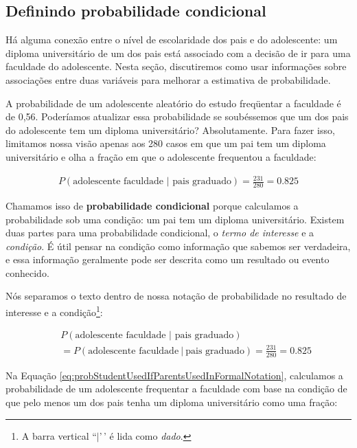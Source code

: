 \documentclass[
]{book}
\theoremstyle{definition}
\theoremstyle{definition}
\theoremstyle{definition}
\theoremstyle{definition}
\theoremstyle{remark}
\begin{document}
\hypertarget{definingConditionalProbability}{%
\subsection{Definindo probabilidade condicional}\label{definingConditionalProbability}}

Há alguma conexão entre o nível de escolaridade dos pais e do adolescente: um diploma universitário de um dos pais está associado com a decisão de ir para uma faculdade do adolescente. Nesta seção, discutiremos como usar informações sobre associações entre duas variáveis para melhorar a estimativa de probabilidade.

A probabilidade de um adolescente aleatório do estudo freqüentar a faculdade é de 0,56. Poderíamos atualizar essa probabilidade se soubéssemos que um dos pais do adolescente tem um diploma universitário? Absolutamente. Para fazer isso, limitamos nossa visão apenas aos 280 casos em que um pai tem um diploma universitário e olha a fração em que o adolescente frequentou a faculdade:

\begin{eqnarray*}
P(\text{adolescente faculdade | pais graduado}) = \frac{231}{280} = 0.825
\end{eqnarray*}

Chamamos isso de \textbf{probabilidade condicional} porque calculamos a probabilidade sob uma condição: um pai tem um diploma universitário. Existem duas partes para uma probabilidade condicional, o \emph{termo de interesse} e a \emph{condição}. É útil pensar na condição como informação que sabemos ser verdadeira, e essa informação geralmente pode ser descrita como um resultado ou evento conhecido.

Nós separamos o texto dentro de nossa notação de probabilidade no resultado de interesse e a condição\footnote{A barra vertical ``\(|\)'\,' é lida como \emph{dado}.}:

\begin{eqnarray}
&& P(\text{adolescente faculdade | pais graduado})  \\
&& = P(\text{adolescente faculdade}\ |\ \text{pais graduado}) = \frac{231}{280} = 0.825
\label{eq:probStudentUsedIfParentsUsedInFormalNotation}
\end{eqnarray}

Na Equação \eqref{eq:probStudentUsedIfParentsUsedInFormalNotation}, calculamos a probabilidade de um adolescente frequentar a faculdade com base na condição de que pelo menos um dos pais tenha um diploma universitário como uma fração:
\end{document}
